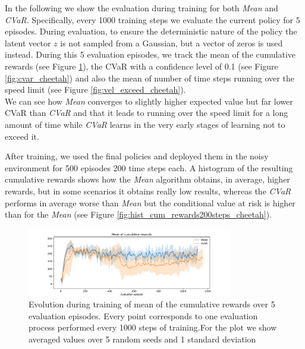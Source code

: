 In the following we show the evaluation during training for both \textit{Mean} and
\textit{CVaR}.
Specifically, every 1000 training steps we evaluate the current policy for 5 episodes.
During evaluation, to ensure the deterministic nature of the policy
the latent vector $z$ is not sampled from a Gaussian, but a vector of zeros is used instead.
During this 5 evaluation episodes, we track the mean of the cumulative rewards (see Figure \ref{fig:mean_cheetah}),
the CVaR with a confidence level of 0.1 (see Figure \ref{fig:cvar_cheetah}) and also the 
mean of number of time steps running over the speed limit (see Figure \ref{fig:vel_exceed_cheetah}).\\
We can see how \textit{Mean} converges to slightly higher
expected value but far lower CVaR than \textit{CVaR} and that it leads to running over the speed limit for 
a long amount of time while \textit{CVaR} learns
in the very early stages of learning not to exceed it.

After training, we used the final policies and deployed them in the noisy environment for 500 episodes 
200 time steps each. A histogram of the resulting cumulative rewards shows
how the \textit{Mean} algorithm obtains, in average, higher rewards, but in some scenarios it 
obtains really low results, whereas the \textit{CVaR} performs in average worse than \textit{Mean} 
but the conditional value at risk is higher than for the \textit{Mean} (see Figure \ref{fig:hist_cum_rewards200steps_cheetah}).



\begin{figure}[ht]
    \centering
    \includegraphics[width=0.8\textwidth]{images/Cheetah_offpolicy_medium/mean_train_withstds.pdf}
    \caption{Evolution during training of mean of the cumulative rewards over 5 evaluation episodes. Every point corresponds
    to one evaluation process performed every 1000 steps of training.For the plot we
    show averaged values over 5 random seeds and 1 standard deviation}
    \label{fig:mean_cheetah}

\end{figure}


